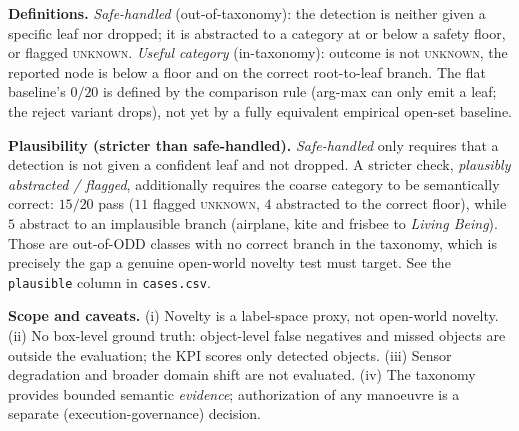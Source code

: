 \documentclass[10pt]{article}
\begin{document}
\textbf{Definitions.} \emph{Safe-handled} (out-of-taxonomy): the detection is
neither given a specific leaf nor dropped; it is abstracted to a category at or
below a safety floor, or flagged \textsc{unknown}. \emph{Useful category}
(in-taxonomy): outcome is not \textsc{unknown}, the reported node is below a
floor and on the correct root-to-leaf branch. The flat baseline's $0/20$ is
defined by the comparison rule (arg-max can only emit a leaf; the reject variant
drops), not yet by a fully equivalent empirical open-set baseline.

\textbf{Plausibility (stricter than safe-handled).} \emph{Safe-handled} only
requires that a detection is not given a confident leaf and not dropped. A
stricter check, \emph{plausibly abstracted / flagged}, additionally requires the
coarse category to be semantically correct: $15/20$ pass ($11$ flagged
\textsc{unknown}, $4$ abstracted to the correct floor), while $5$ abstract to an
implausible branch (airplane, kite and frisbee to \emph{Living Being}). Those are
out-of-ODD classes with no correct branch in the taxonomy, which is precisely the
gap a genuine open-world novelty test must target. See the \texttt{plausible}
column in \texttt{cases.csv}.

\textbf{Scope and caveats.} (i) Novelty is a label-space proxy, not open-world
novelty. (ii) No box-level ground truth: object-level false negatives and missed
objects are outside the evaluation; the KPI scores only detected objects.
(iii) Sensor degradation and broader domain shift are not evaluated.
(iv) The taxonomy provides bounded semantic \emph{evidence}; authorization of any
manoeuvre is a separate (execution-governance) decision.
\end{document}
